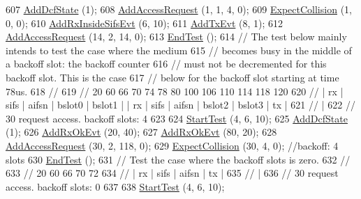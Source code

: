 \begin{DoxyCode}
607   \hyperlink{classDcfManagerTest_ab48a072efc828fc250036b45c3db1832}{AddDcfState} (1);
608   \hyperlink{classDcfManagerTest_a1f016026b88c036eed9ce87bfc32b71a}{AddAccessRequest} (1, 1, 4, 0);
609   \hyperlink{classDcfManagerTest_a1f78350a941a4ca0e28260c8f6390e45}{ExpectCollision} (1, 0, 0);
610   \hyperlink{classDcfManagerTest_ae4d9c6e0db3b3a2f82c14eaf955549f9}{AddRxInsideSifsEvt} (6, 10);
611   \hyperlink{classDcfManagerTest_a948ed481ee010a8ccc1b434022ed962d}{AddTxEvt} (8, 1);
612   \hyperlink{classDcfManagerTest_a1f016026b88c036eed9ce87bfc32b71a}{AddAccessRequest} (14, 2, 14, 0);
613   \hyperlink{classDcfManagerTest_acc78df96a60d77fdb57a9f93029dca6c}{EndTest} ();
614   \textcolor{comment}{// The test below mainly intends to test the case where the medium}
615   \textcolor{comment}{// becomes busy in the middle of a backoff slot: the backoff counter}
616   \textcolor{comment}{// must not be decremented for this backoff slot. This is the case}
617   \textcolor{comment}{// below for the backoff slot starting at time 78us.}
618   \textcolor{comment}{//}
619   \textcolor{comment}{//  20          60     66      70        74        78  80    100     106      110      114      118   120}
620   \textcolor{comment}{//   |    rx     | sifs | aifsn | bslot0  | bslot1  |   | rx   | sifs  |  aifsn | bslot2 | bslot3 | tx  |}
621   \textcolor{comment}{//        |}
622   \textcolor{comment}{//       30 request access. backoff slots: 4}
623 
624   \hyperlink{classDcfManagerTest_a5e7a2ff4209e9602aea95d4efa51ae91}{StartTest} (4, 6, 10);
625   \hyperlink{classDcfManagerTest_ab48a072efc828fc250036b45c3db1832}{AddDcfState} (1);
626   \hyperlink{classDcfManagerTest_afc9e919cbe6497efb6a1b10d484de251}{AddRxOkEvt} (20, 40);
627   \hyperlink{classDcfManagerTest_afc9e919cbe6497efb6a1b10d484de251}{AddRxOkEvt} (80, 20);
628   \hyperlink{classDcfManagerTest_a1f016026b88c036eed9ce87bfc32b71a}{AddAccessRequest} (30, 2, 118, 0);
629   \hyperlink{classDcfManagerTest_a1f78350a941a4ca0e28260c8f6390e45}{ExpectCollision} (30, 4, 0); \textcolor{comment}{//backoff: 4 slots}
630   \hyperlink{classDcfManagerTest_acc78df96a60d77fdb57a9f93029dca6c}{EndTest} ();
631   \textcolor{comment}{// Test the case where the backoff slots is zero.}
632   \textcolor{comment}{//}
633   \textcolor{comment}{//  20          60     66      70   72}
634   \textcolor{comment}{//   |    rx     | sifs | aifsn | tx |}
635   \textcolor{comment}{//        |}
636   \textcolor{comment}{//       30 request access. backoff slots: 0}
637 
638   \hyperlink{classDcfManagerTest_a5e7a2ff4209e9602aea95d4efa51ae91}{StartTest} (4, 6, 10);

\end{DoxyCode}
